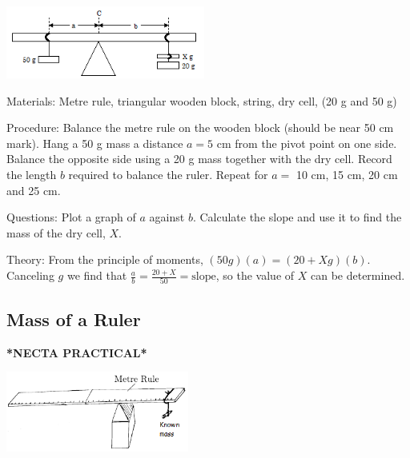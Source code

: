 \begin{multicols}{2}
\begin{center}
\includegraphics[width=0.49\textwidth]{./img/unknown-mass.png}
\end{center}

\begin{description*}
\item[Materials:]{Metre rule, triangular wooden block, string, dry cell,  (20 g and 50 g)}
\item[Procedure:]{Balance the metre rule on the wooden block (should be near 50 cm mark). Hang a 50 g mass a distance $a=5$ cm from the pivot point on one side. Balance the opposite side using a 20 g mass together with the dry cell. Record the length $b$ required to balance the ruler. Repeat for $a =$ 10 cm, 15 cm, 20 cm and 25 cm.}
\item[Questions:]{Plot a graph of $a$ against $b$. Calculate the slope and use it to find the mass of the dry cell, $X$.}
\item[Theory:]{From the principle of moments, $(50 g)(a) = (20 + X g)(b)$. Canceling $g$ we find that $\frac{a}{b} = \frac{20 + X}{50} = \text{slope}$, so the value of $X$ can be determined.}
\end{description*}

\subsection{Mass of a Ruler}
\textbf{*NECTA PRACTICAL*}

\begin{center}
\includegraphics[width=0.45\textwidth]{./img/mass-of-ruler.png}
\end{center}


\end{multicols}
